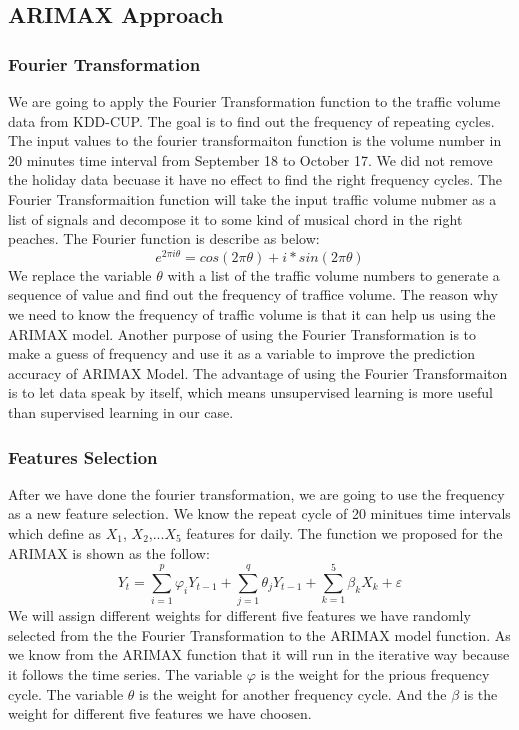 \documentclass[journal, letterpaper]{IEEEtran}
\begin{document}
\subsection{ARIMAX Approach}
\subsubsection{Fourier Transformation}
We are going to apply the Fourier Transformation function to the traffic volume data from KDD-CUP. The goal is to find out the frequency of repeating cycles. The input values to the fourier transformaiton function is the volume number in 20 minutes time interval from September 18 to October 17. We did not remove the holiday data becuase it have no effect to find the right frequency cycles. The Fourier Transformaition function will take the input traffic volume nubmer as a list of signals and decompose it to some kind of musical chord in the right peaches. The Fourier function is describe as below:
$$e^{2\pi i \theta} = cos(2\pi\theta) + i*sin(2\pi\theta)$$
We replace the variable $\theta$ with a list of the traffic volume numbers to generate a sequence of value and find out the frequency of traffice volume. The reason why we need to know the frequency of traffic volume is that it can help us using the ARIMAX model. Another purpose of using the Fourier Transformation is to make a guess of frequency and use it as a variable to improve the prediction accuracy of ARIMAX Model. The advantage of using the Fourier Transformaiton is to let data speak by itself, which means unsupervised learning is more useful than supervised learning in our case. 
\subsubsection{Features Selection}
After we have done the fourier transformation, we are going to use the frequency as a new feature selection. We know the repeat cycle of 20 minitues time intervals which define as $X_{1}$, $X_{2}$,...$X_{5}$ features for daily. The function we proposed for the ARIMAX is shown as the follow:
$$Y_{t} = \sum_{i=1}^{p}\varphi_{i}Y_{t-1}+\sum_{j=1}^{q}\theta_{j}Y_{t-1}+\sum_{k=1}^{5}\beta_{k}X_{k} +\varepsilon $$
We will assign different weights for different five features we have randomly selected from the the Fourier Transformation to the ARIMAX model function. As we know from the ARIMAX function that it will run in the iterative way because it follows the time series. The variable $\varphi$ is the weight for the prious frequency cycle. The variable $\theta$ is the weight for another frequency cycle. And the $\beta$ is the weight for different five features we have choosen. 
\end{document}
